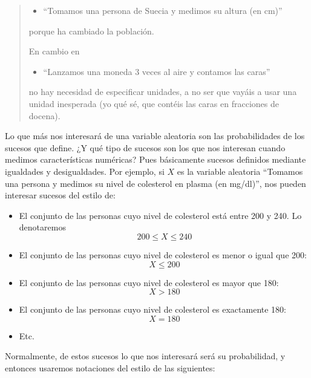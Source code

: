 \documentclass[
  spanish,
  letterpaper,
  DIV=11,
  numbers=noendperiod]{scrreprt}
\providecommand{\tightlist}{%
  \setlength{\itemsep}{0pt}\setlength{\parskip}{0pt}}
\begin{document}
\begin{tcolorbox}
\begin{quote}
\begin{itemize}
\tightlist
\item
  ``Tomamos una persona de Suecia y medimos su altura (en cm)''
\end{itemize}

porque ha cambiado la población.

En cambio en

\begin{itemize}
\tightlist
\item
  ``Lanzamos una moneda 3 veces al aire y contamos las caras''
\end{itemize}

no hay necesidad de especificar unidades, a no ser que vayáis a usar una
unidad inesperada (yo qué sé, que contéis las caras en fracciones de
docena).
\end{quote}

Lo que más nos interesará de una variable aleatoria son las
probabilidades de los sucesos que define. ¿Y qué tipo de sucesos son los
que nos interesan cuando medimos características numéricas? Pues
básicamente sucesos definidos mediante igualdades y desigualdades. Por
ejemplo, si \(X\) es la variable aleatoria ``Tomamos una persona y
medimos su nivel de colesterol en plasma (en mg/dl)'', nos pueden
interesar sucesos del estilo de:

\begin{itemize}
\item
  El conjunto de las personas cuyo nivel de colesterol está entre 200 y
  240. Lo denotaremos \[
  200\leqslant X\leqslant 240
  \]
\item
  El conjunto de las personas cuyo nivel de colesterol es menor o igual
  que 200: \[
  X\leqslant 200
  \]
\item
  El conjunto de las personas cuyo nivel de colesterol es mayor que 180:
  \[
  X>180
  \]
\item
  El conjunto de las personas cuyo nivel de colesterol es exactamente
  180: \[
  X=180
  \]
\item
  Etc.
\end{itemize}

Normalmente, de estos sucesos lo que nos interesará será su
probabilidad, y entonces usaremos notaciones del estilo de las
siguientes:


\end{tcolorbox}
\end{document}
